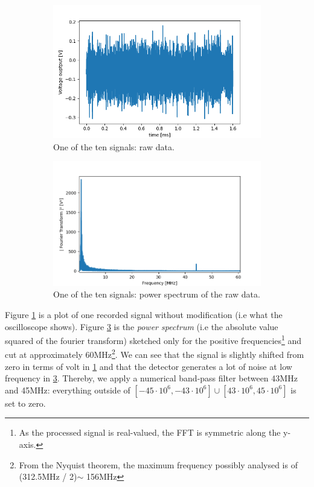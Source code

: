 \documentclass[10pt]{report}
\begin{document}
\begin{figure}[h!]
\centering
\begin{subfigure}{.48\textwidth}
  \centering
  \includegraphics[width=1.1\linewidth]{st-f-rough}
  \caption{One of the ten signals: raw data.}
  \label{fig:st-f-rough}
\end{subfigure}%
\hspace{1em}%
\begin{subfigure}{.48\textwidth}
  \centering
  \includegraphics[width=1.1\linewidth]{st-fft-rough}
  \caption{One of the ten signals: power spectrum of the raw data.}
  \label{fig:st-fft-rough}
\end{subfigure}
\caption{}
\end{figure}

Figure \ref{fig:st-f-rough} is a plot of one recorded signal without modification (i.e what the oscilloscope shows). Figure \ref{fig:st-fft-rough} is the \textit{power spectrum} (i.e the absolute value squared of the fourier transform) sketched only for the positive frequencies\footnote{As the processed signal is real-valued, the FFT is symmetric along the y-axis.} and cut at approximately 60MHz\footnote{From the Nyquist theorem, the maximum frequency possibly analysed is of (312.5MHz / 2)$\sim$ 156MHz}. We can see that the signal is slightly shifted from zero in terms of volt in \ref{fig:st-f-rough} and that the detector generates a lot of noise at low frequency in \ref{fig:st-fft-rough}. Thereby, we apply a numerical band-pass filter between 43MHz and 45MHz: everything outside of $\left[-45\cdot 10^6, -43\cdot 10^6 \right] \cup \left[43\cdot 10^6, 45\cdot 10^6 \right]$ is set to zero.
\end{document}
